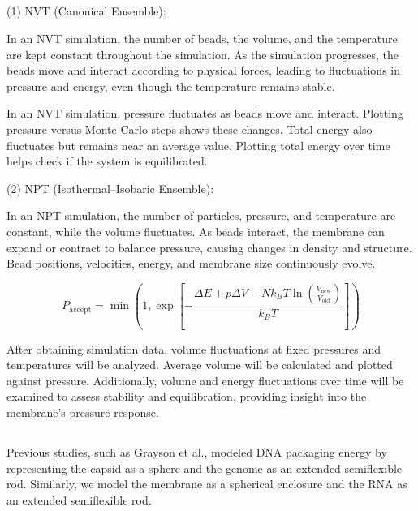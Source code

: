 \documentclass[12pt]{article}
\begin{document}
\begin{flushleft}
\subsection*{}

(1) NVT (Canonical Ensemble): 

In an NVT simulation, the number of beads, the volume, and the temperature are kept constant throughout the simulation.  As the simulation progresses, the beads move and interact according to physical forces, leading to fluctuations in pressure and energy, even though the temperature remains stable. 

In an NVT simulation, pressure fluctuates as beads move and interact. Plotting pressure versus Monte Carlo steps shows these changes. Total energy also fluctuates but remains near an average value. Plotting total energy over time helps check if the system is equilibrated.
   
   

(2) NPT (Isothermal–Isobaric Ensemble): 

In an NPT simulation, the number of particles, pressure, and temperature are constant, while the volume fluctuates. As beads interact, the membrane can expand or contract to balance pressure, causing changes in density and structure. Bead positions, velocities, energy, and membrane size continuously evolve.
        
\begin{equation}
P_{\text{accept}} = \min \left( 1, \exp \left[ - \frac{\Delta E + p \Delta V - N k_B T \ln \left( \frac{V_{\text{new}}}{V_{\text{old}}} \right)}{k_B T} \right] \right)
\end{equation}
 
After obtaining simulation data, volume fluctuations at fixed pressures and temperatures will be analyzed. Average volume will be calculated and plotted against pressure. Additionally, volume and energy fluctuations over time will be examined to assess stability and equilibration, providing insight into the membrane’s pressure response. 

\subsection*{}

Previous studies, such as Grayson et al.\cite{Grayson2006}, modeled DNA packaging energy by representing the capsid as a sphere and the genome as an extended semiflexible rod. Similarly, we model the membrane as a spherical enclosure and the RNA as an extended semiflexible rod.


\end{flushleft}
\end{document}
